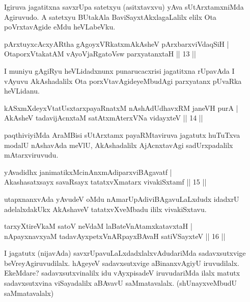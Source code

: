 \begin{artha}
Igiruva jagatitxna savxrUpa satetxyu (asitxtavxvu) yAva sUtArxtamxniMda Agiruvudo. A satetxyu BUtakAla BaviSayxtAkxlagaLalilx elilx Ota poVrxtavAgide eMdu heVLabeVku.
\end{artha}

\begin{shl}
pArxtuyxcAcxyARtha gAgoyxVRkatxmAkAsheV pArxbarxviVdaqSiH |\\
OtaporxVtakatAM vAyoVjaRgatoV\s sw parxyatanxtaH \hfill || 13 ||
\end{shl}

\begin{artha}
I muniyu gAgiRyu heVLidadxnunx punarucacxrisi jagatitxna rUpavAda I vAyuvu AkAshadalilx Ota porxVtavAgideyeMbudAgi parxyatanx pUvaRka heVLidanu.
\end{artha}%

\begin{shl}
kASxmXdeyxVtatUsxtarxpayaRnatxM nAshAdUdhavxRM janeVH purA |\\
AkAsheV tadavijAcnxtaM satAtxmAterxVNa vidayxteV \hfill || 14 ||
\end{shl}

\begin{artha}
paqthiviyiMda AraMBisi sUtArxtamx payaRMtaviruva jagatutx huTuTxva modalU nAshavAda meVlU, AkAshadalilx AjAcnxtavAgi sadUrxpadalilx mAtarxviruvudu.
\end{artha}

\begin{shl}
yAvadidhx janimatikxMcinAnxmAdiparxviBAgavatf |\\
Akashasatxsayx savaRsayx tatatxvXmatarx vivakiSxtamf \hfill || 15 ||
\end{shl}

\begin{artha}
utapxnanxvAda yAvudeV oMdu nAmarUpAdiviBAgavuLaLxdudx idadxrU adelalxdakUkx AkAshaveV tatatxvXveMbadu ililx vivakiSxtavu.
\end{artha}

\begin{shl}
tarxyXtireVkaM satoV neVdaM laBateV\s nAtamxkatavxtaH |\\
nApayxnavxyaM tadavAyxpetxVnARpayxBAvaH satiVSayxteV \hfill || 16 ||
\end{shl}

\begin{artha}
I jagatutx (nijavAda) savxrUpavuLaLxdadxlalxvAdudariMda sadavxsutxvige beVreyAgi\-ruvudilalx. hAgeyeV sadavxsutxvige aBinanxvAgiyU iruvudilalx. EkeMdare? sadavxsutxvinalilx idu vAyxpisadeV iruvudariMda ilalx matutx sadavxsutxvina viSayadalilx aBAvavU saMmatavalalx. (shUnayxveMbudU saMmatavalalx) 
\end{artha}

